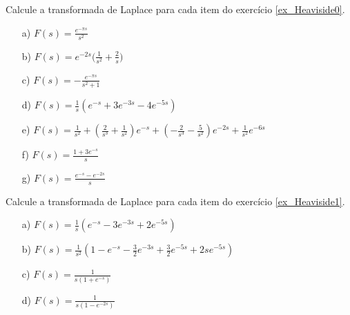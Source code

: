 \begin{exer} Calcule a transformada de Laplace para cada item do exercício \ref{ex_Heaviside0}.
\end{exer}
\begin{resp}
 \begin{itemize}
 \item [a)] $F(s)=\displaystyle \frac{e^{-\pi s}}{s^2}$
 \item [b)] $F(s)=\displaystyle e^{-2s}\bigg(\frac{1}{s^2}  + \frac{2}{s}\bigg)$
 \item [c)] $F(s)=\displaystyle - \frac{e^{-\pi s}}{s^2 +1}$
 \item [d)] $F(s)=\frac{1}{s}\left(e^{-s}+3e^{-3s}-4e^{-5s}\right)$
 \item [e)] $F(s)=\frac{1}{s^2}+\left(\frac{2}{s^3}+\frac{1}{s^2}\right)e^{-s}+\left(-\frac{2}{s^3}-\frac{5}{s^2}\right)e^{-2s}+\frac{1}{s^2}e^{-6s}$ 
 \item [f)]$F(s) = \frac{1+3e^{-s}}{s}$
 \item [g)] $F(s) = \frac{e^{-s}-e^{-2s}}{s}$ 
 \end{itemize}
\end{resp}
\begin{exer} Calcule a transformada de Laplace para cada item do exercício \ref{ex_Heaviside1}.
\end{exer}
\begin{resp}
 \begin{itemize}
  \item[a)] $F(s)=\frac{1}{s}\left(e^{-s}-3e^{-3s}+2e^{-5s}\right)$
    \item[b)] $F(s)=\frac{1}{s^2}\left(1-e^{-s}-\frac{3}{2}e^{-3s}+\frac{3}{2}e^{-5s}+2se^{-5s}\right)$
        \item[c)] $F(s)=\frac{1}{s(1+e^{-s})}$
        \item[d)] $F(s)=\frac{1}{s(1-e^{-2s})}$ 
 \end{itemize}
\end{resp}
